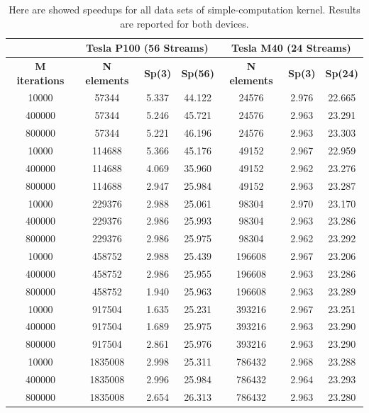 			
	\begin{table}	
		\centering
		\begin{tabular}{ | c ||  c | c | c  || c | c | c | } 
			\hline
			& \multicolumn{3}{c}{\textbf{Tesla P100 (56 Streams)}} & \multicolumn{3}{c}{\textbf{Tesla M40 (24 Streams)}}\\ [0.5ex]
			\hline\hline
		\textbf{M iterations}  & \textbf{N elements} & \textbf{Sp(3)} & \textbf{Sp(56)} & \textbf{N elements}  & \textbf{Sp(3)} & \textbf{Sp(24)} \\
			\hline
			10000&	57344 &	5.337&	44.122&	24576&	2.976&	22.665\\
			400000&	57344&	5.246&	45.721&	24576&	2.963&	23.291\\
			800000&	57344&	5.221&	46.196&	24576&	2.963&	23.303\\
			\hline
			10000&	114688&	5.366&	45.176&	49152&	2.967&	22.959\\
			400000&	114688&	4.069&	35.960&	49152&	2.962&	23.276\\
			800000&	114688&	2.947&	25.984&	49152&	2.963&	23.287\\
			\hline
			10000&	229376&	2.988&	25.061&	98304&	2.970&	23.170\\
			400000&	229376&	2.986&	25.993&	98304&	2.963&	23.286\\
			800000&	229376&	2.986&	25.975&	98304&	2.962&	23.292\\
			\hline
			10000&	458752&	2.988&	25.439&	196608&	2.967&	23.206\\
			400000&	458752&	2.986&	25.955&	196608&	2.963&	23.286\\
			800000&	458752&	1.940&	25.963&	196608&	2.963&	23.289\\
			\hline
			10000&	917504&	1.635&	25.231&	393216&	2.967&	23.251\\
			400000&	917504&	1.689&	25.975&	393216&	2.963&	23.290\\
			800000&	917504&	2.861&	25.976&	393216&	2.963&	23.290\\
			\hline
			10000&	1835008&	2.998&	25.311&	786432&	2.968&	23.288\\
			400000&	1835008&	2.996&	25.984&	786432&	2.964&	23.293\\
			800000&	1835008&	2.654&	26.313&	786432&	2.963&	23.280\\
			
			
		\hline
					
					
		\end{tabular}
		\caption{Here are showed speedups for all data sets of simple-computation kernel. Results are reported for both devices.}	
		\label{tab:cosspeedup}		
	\end{table}
			
